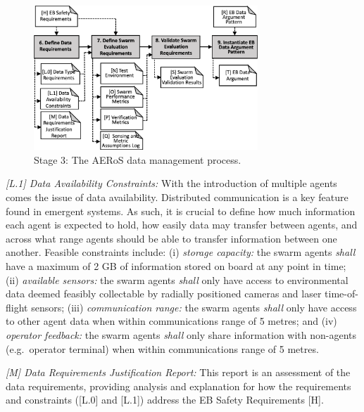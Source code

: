 \documentclass[runningheads]{llncs}
\begin{document}
\begin{figure}[!ht]
	\centering
	\includegraphics[width=0.75\textwidth]{figures/AERoS-Stage3.png}%
	\vspace{-2ex}
	\caption{Stage 3: The AERoS data management process.}
	\label{amlas-a-stage3}
	\vspace{-4ex}
\end{figure}

\emph{[L.1] Data Availability Constraints:}
With the introduction of multiple agents comes the issue of data availability. Distributed communication is a key feature found in emergent systems. As such, it is crucial to define how much information each agent is expected to hold, how easily data may transfer between agents, and across what range agents should be able to transfer information between one another. Feasible constraints include: (i) \emph{storage capacity: }the swarm agents \emph{shall} have a maximum of 2 GB of information stored on board at any point in time; (ii) \emph{available sensors:} the swarm agents \emph{shall} only have access to environmental data deemed feasibly collectable by radially positioned cameras and laser time-of-flight sensors; (iii) \emph{communication range:} the swarm agents \emph{shall} only have access to other agent data when within communications range of 5 metres; and (iv) \emph{operator feedback:} the swarm agents \emph{shall} only share information with non-agents (e.g.\ operator terminal) when within communications range of 5 metres.

\emph{[M] Data Requirements Justification Report:}
This report is an assessment of the data requirements, providing analysis and explanation for how the requirements and constraints ([L.0] and [L.1]) address the EB Safety Requirements [H].
\end{document}
